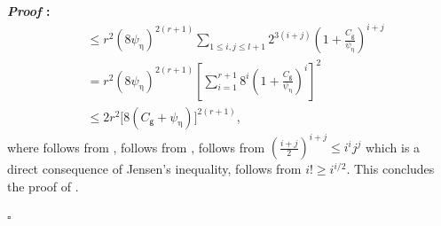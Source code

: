 \documentclass{article}
\renewenvironment{proof}{\noindent\textbf{\textit{Proof }:}}{\hfill$\square$}
\begin{document}
\begin{proof}
\begin{align}
        &\leq r^2 (8\psi_{\upeta})^{2(r+1)} \sum_{1\leq i,j \leq l+1} 2^{3(i+j)}\left(1+\frac{C_{\mathsf{g}}}{\psi_{\upeta}}\right)^{i+j} \label{eq:var-bound-T-4} \\
        &= r^2 (8\psi_{\upeta})^{2(r+1)} \left[ \sum_{i=1}^{r+1} 8^i\left(1+\frac{C_{\mathsf{g}}}{\psi_{\upeta}}\right)^i  \right]^2 \\
        &\leq 2r^2 \big[8(C_{\mathsf{g}}+\psi_{\upeta})\big]^{2(r+1)},
    \end{align}
    where  follows from ,  follows from ,  follows from $\left(\frac{i+j}{2}\right)^{i+j}\leq i^i j^j$ which is a direct consequence of Jensen's inequality,  follows from $i! \geq i^{i/2}$. This concludes the proof of .


\end{proof}
\end{document}
